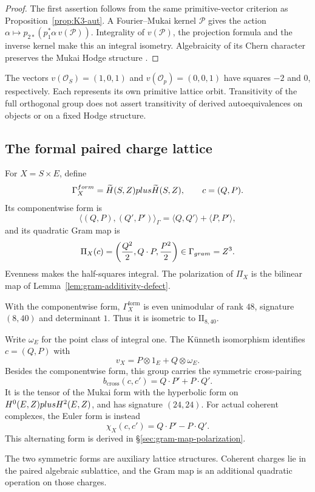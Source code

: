 \begin{proof}
The first assertion follows from the same primitive-vector criterion
as Proposition~\ref{prop:K3-aut}.  A Fourier--Mukai kernel $\mathcal P$ gives the action
$\alpha\mapsto p_{2*}(p_1^*\alpha\,v(\mathcal P))$.  Integrality
of $v(\mathcal P)$, the projection formula and the inverse kernel
make this an integral isometry.  Algebraicity of its Chern character
preserves the Mukai Hodge structure
\cite[Chapter~16, Lemma~3.1 and Proposition~3.2]{HuybrechtsK3}.
\end{proof}

The vectors $v(\mathcal O_S)=(1,0,1)$ and $v(\mathcal O_p)=(0,0,1)$
have squares $-2$ and $0$, respectively.  Each represents its own
primitive lattice orbit.  Transitivity of the full orthogonal group
does not assert transitivity of derived autoequivalences on objects
or on a fixed Hodge structure.

\subsection{The formal paired charge lattice}
\label{app:lattice-formal-dyonic}

\begin{definition}
\label{def:gamma-X-form}
For $X=S\times E$, define
\[
\Gamma_X^{form}
=\widetilde H(S,Z)plus\widetilde H(S,Z),\qquad c=(Q,P).
\]
Its componentwise form is
\[
\langle(Q,P),(Q',P')\rangle_\Gamma
=\langle Q,Q'\rangle+\langle P,P'\rangle,
\]
and its quadratic Gram map is
\[
\Pi_X(c)=\left(\frac{Q^2}{2},Q\cdot P,\frac{P^2}{2}\right)
\in\Gamma_{gram}=Z^3.
\]
Evenness makes the half-squares integral.  The polarization of
$\Pi_X$ is the bilinear map of
Lemma~\ref{lem:gram-additivity-defect}.
\end{definition}

\begin{verification}
\label{ver:gamma-X-form-invariants}
With the componentwise form, $\Gamma_X^{\mathrm{form}}$ is even
unimodular of rank $48$, signature $(8,40)$ and determinant $1$.
Thus it is isometric to $\mathrm{II}_{8,40}$.
\end{verification}

\begin{remark}
\label{rem:gamma-X-vs-K3E}
Write $\omega_E$ for the point class of integral one.  The K\"unneth
isomorphism identifies $c=(Q,P)$ with
\[
v_X=P\otimes1_E+Q\otimes\omega_E.
\]
Besides the componentwise form, this group carries the symmetric
cross-pairing
\[
b_{\mathrm{cross}}(c,c')=Q\cdot P'+P\cdot Q'.
\]
It is the tensor of the Mukai form with the hyperbolic form on
$H^0(E,Z)plus H^2(E,Z)$, and has signature $(24,24)$.
For actual coherent complexes, the Euler form is instead
\[
\chi_X(c,c')=Q\cdot P'-P\cdot Q'.
\]
This alternating form is derived in
\S\ref{sec:gram-map-polarization}.

The two symmetric forms
are auxiliary lattice structures.  Coherent charges lie in the
paired algebraic sublattice, and the Gram map is an additional
quadratic operation on those charges.
\end{remark}


